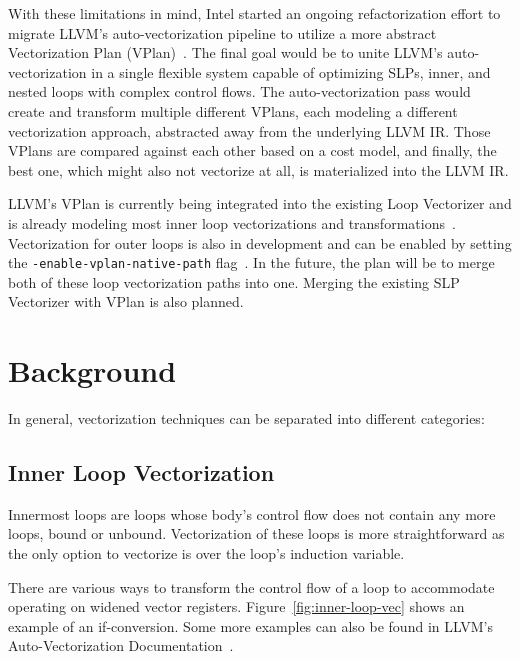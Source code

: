 \documentclass[sigplan,11pt,nonacm]{acmart}
\begin{document}
With these limitations in mind, Intel started an ongoing refactorization effort to migrate LLVM's
auto-vectorization pipeline to utilize a more abstract Vectorization Plan 
(VPlan)~\cite{llvmextloopvec,llvmvplan}. The final goal would be to unite LLVM's auto-vectorization
in a single flexible system capable of optimizing SLPs, inner, and nested loops with complex 
control flows. The auto-vectorization pass would create and transform multiple different 
VPlans, each modeling a different vectorization approach, abstracted away from the underlying LLVM IR.
Those VPlans are compared against each other based on a cost model, and finally, the best one, which
might also not vectorize at all, is materialized into the LLVM IR.

LLVM's VPlan is currently being integrated into the existing Loop Vectorizer and is
already modeling most inner loop vectorizations and transformations~\cite{llvmvplanupdate}. 
Vectorization for outer loops is also in development and can be enabled by setting 
the \texttt{-enable-vplan-native-path} flag~\cite{llvmouterloop}. In the future, the plan will 
be to merge both of these loop vectorization paths into one. Merging the existing SLP Vectorizer
with VPlan is also planned.




\section{Background}
\label{sec:background}
In general, vectorization techniques can be separated into different categories:

\subsection{Inner Loop Vectorization}
Innermost loops are loops whose body's control flow does not contain any more loops, bound or unbound.
Vectorization of these loops is more straightforward as the only option to vectorize is over 
the loop's induction variable.

There are various ways to transform the control flow of a loop to accommodate operating on widened
vector registers. Figure~\ref{fig:inner-loop-vec} shows an example of an if-conversion. Some more
examples can also be found in LLVM's Auto-Vectorization Documentation~\cite{llvmvec}.
\end{document}
